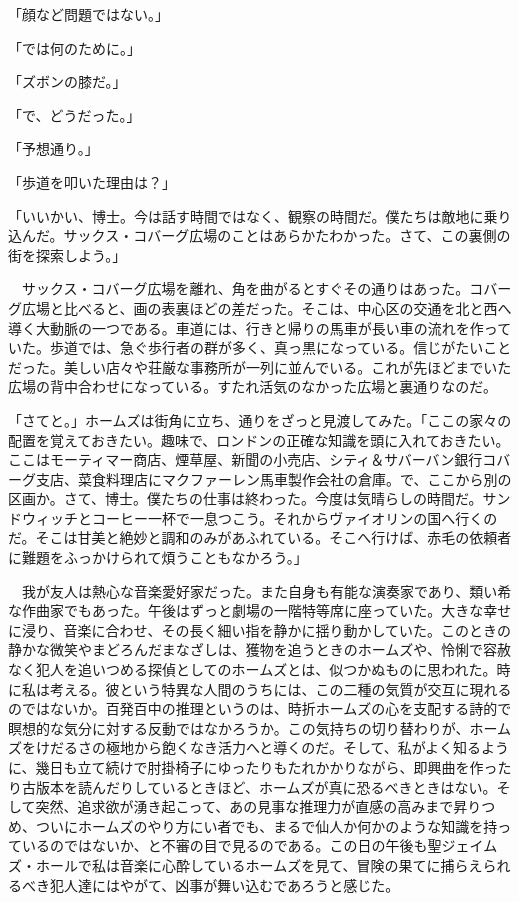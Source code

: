 \documentclass[tate,paper=b6j,jafontsize=9pt]{jlreq}
\begin{document}
「顔など問題ではない。」

「では何のために。」

「ズボンの膝だ。」

「で、どうだった。」

「予想通り。」

「歩道を叩いた理由は？」

「いいかい、博士。今は話す時間ではなく、観察の時間だ。僕たちは敵地に乗り込んだ。サックス・コバーグ広場のことはあらかたわかった。さて、この裏側の街を探索しよう。」

　サックス・コバーグ広場を離れ、角を曲がるとすぐその通りはあった。コバーグ広場と比べると、画の表裏ほどの差だった。そこは、中心区の交通を北と西へ導く大動脈の一つである。車道には、行きと帰りの馬車が長い車の流れを作っていた。歩道では、急ぐ歩行者の群が多く、真っ黒になっている。信じがたいことだった。美しい店々や荘厳な事務所が一列に並んでいる。これが先ほどまでいた広場の背中合わせになっている。すたれ活気のなかった広場と裏通りなのだ。

「さてと。」ホームズは街角に立ち、通りをざっと見渡してみた。「ここの家々の配置を覚えておきたい。趣味で、ロンドンの正確な知識を頭に入れておきたい。ここはモーティマー商店、煙草屋、新聞の小売店、シティ＆サバーバン銀行コバーグ支店、菜食料理店にマクファーレン馬車製作会社の倉庫。で、ここから別の区画か。さて、博士。僕たちの仕事は終わった。今度は気晴らしの時間だ。サンドウィッチとコーヒー一杯で一息つこう。それからヴァイオリンの国へ行くのだ。そこは甘美と絶妙と調和のみがあふれている。そこへ行けば、赤毛の依頼者に難題をふっかけられて煩うこともなかろう。」


　我が友人は熱心な音楽愛好家だった。また自身も有能な演奏家であり、類い希な作曲家でもあった。午後はずっと劇場の一階特等席に座っていた。大きな幸せに浸り、音楽に合わせ、その長く細い指を静かに揺り動かしていた。このときの静かな微笑やまどろんだまなざしは、獲物を追うときのホームズや、怜悧で容赦なく犯人を追いつめる探偵としてのホームズとは、似つかぬものに思われた。時に私は考える。彼という特異な人間のうちには、この二種の気質が交互に現れるのではないか。百発百中の推理というのは、時折ホームズの心を支配する詩的で瞑想的な気分に対する反動ではなかろうか。この気持ちの切り替わりが、ホームズをけだるさの極地から飽くなき活力へと導くのだ。そして、私がよく知るように、幾日も立て続けで肘掛椅子にゆったりもたれかかりながら、即興曲を作ったり古版本を読んだりしているときほど、ホームズが真に恐るべきときはない。そして突然、追求欲が湧き起こって、あの見事な推理力が直感の高みまで昇りつめ、ついにホームズのやり方にい者でも、まるで仙人か何かのような知識を持っているのではないか、と不審の目で見るのである。この日の午後も聖ジェイムズ・ホールで私は音楽に心酔しているホームズを見て、冒険の果てに捕らえられるべき犯人達にはやがて、凶事が舞い込むであろうと感じた。
\end{document}
